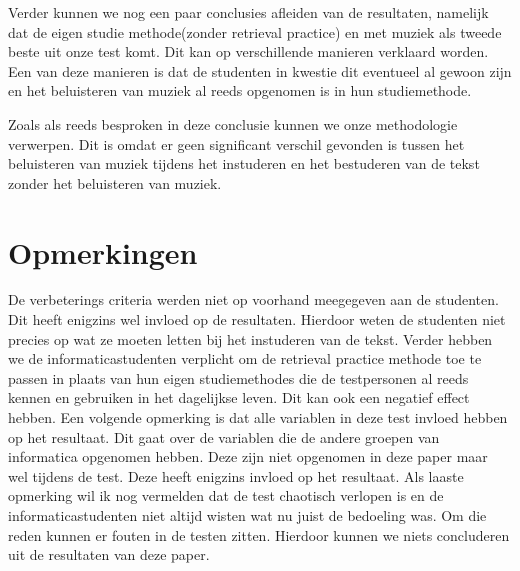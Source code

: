 \documentclass{hogent-article}
\begin{document}
	Verder kunnen we nog een paar conclusies afleiden van de resultaten, namelijk dat de eigen studie methode(zonder retrieval practice) en met muziek als tweede beste uit onze test komt. Dit kan op verschillende manieren verklaard worden. Een van deze manieren is dat de studenten in kwestie dit eventueel al gewoon zijn en het beluisteren van muziek al reeds opgenomen is in hun studiemethode. 
	
	Zoals als reeds besproken in deze conclusie kunnen we onze methodologie verwerpen. Dit is omdat er geen significant verschil gevonden is tussen het beluisteren van muziek tijdens het instuderen en het bestuderen van de tekst zonder het beluisteren van muziek.
	
	
	\section{Opmerkingen}
	De verbeterings criteria werden niet op voorhand meegegeven aan de studenten. Dit heeft enigzins wel invloed op de resultaten. Hierdoor weten de studenten niet precies op wat ze moeten letten bij het instuderen van de tekst.
	Verder hebben we de informaticastudenten verplicht om de retrieval practice methode toe te passen in plaats van hun eigen studiemethodes die de testpersonen al reeds kennen en gebruiken in het dagelijkse leven. Dit kan ook een negatief effect hebben.
	Een volgende opmerking is dat alle variablen in deze test invloed hebben op het resultaat. Dit gaat over de variablen die de andere groepen van informatica opgenomen hebben. Deze zijn niet opgenomen in deze paper maar wel tijdens de test. Deze heeft enigzins invloed op het resultaat.
	Als laaste opmerking wil ik nog vermelden dat de test chaotisch verlopen is en de informaticastudenten niet altijd wisten wat nu juist de bedoeling was. Om die reden kunnen er fouten in de testen zitten. 
	Hierdoor kunnen we niets concluderen uit de resultaten van deze paper.
	
	
	\printbibliography[heading=bibintoc]
	
\end{document}
